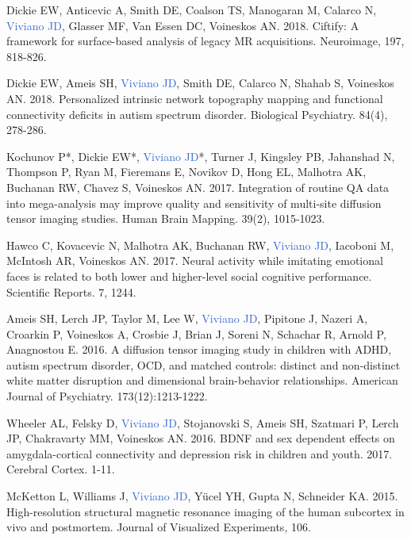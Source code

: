 \documentclass[a4paper,11pt,oneside]{book}
\newcommand\paper[1]{
    #1\\
    \vspace{3.5mm}
}
\begin{document}
\begin{flushleft}
\paper{Dickie EW, Anticevic A, Smith DE, Coalson TS, Manogaran M, Calarco N, \textcolor{highlight}{Viviano JD}, Glasser MF, Van Essen DC, Voineskos AN. 2018. Ciftify: A framework for surface-based analysis of legacy MR acquisitions. Neuroimage, 197, 818-826.}

\paper{Dickie EW, Ameis SH, \textcolor{highlight}{Viviano JD}, Smith DE, Calarco N, Shahab S, Voineskos AN. 2018. Personalized intrinsic network topography mapping and functional connectivity deficits in autism spectrum disorder. Biological Psychiatry. 84(4), 278-286.}


\paper{Kochunov P*, Dickie EW*, \textcolor{highlight}{Viviano JD}*, Turner J, Kingsley PB, Jahanshad N, Thompson P, Ryan M, Fieremans E, Novikov D, Hong EL, Malhotra AK, Buchanan RW, Chavez S, Voineskos AN. 2017. Integration of routine QA data into mega-analysis may improve quality and sensitivity of multi-site diffusion tensor imaging studies. Human Brain Mapping. 39(2), 1015-1023.}

\paper{Hawco C, Kovacevic N, Malhotra AK, Buchanan RW, \textcolor{highlight}{Viviano JD}, Iacoboni M, McIntosh AR, Voineskos AN. 2017. Neural activity while imitating emotional faces is related to both lower and higher-level social cognitive performance. Scientific Reports. 7, 1244.}

\paper{Ameis SH, Lerch JP, Taylor M, Lee W, \textcolor{highlight}{Viviano JD}, Pipitone J, Nazeri A, Croarkin P, Voineskos A, Crosbie J, Brian J, Soreni N, Schachar R, Arnold P, Anagnostou E. 2016. A diffusion tensor imaging study in children with ADHD, autism spectrum disorder, OCD, and matched controls: distinct and non-distinct white matter disruption and dimensional brain-behavior relationships. American Journal of Psychiatry. 173(12):1213-1222.}

\paper{Wheeler AL, Felsky D, \textcolor{highlight}{Viviano JD}, Stojanovski S, Ameis SH, Szatmari P, Lerch JP, Chakravarty MM, Voineskos AN. 2016. BDNF and sex dependent effects on amygdala-cortical connectivity and depression risk in children and youth. 2017. Cerebral Cortex. 1-11.}

\paper{McKetton L, Williams J, \textcolor{highlight}{Viviano JD}, Yücel YH, Gupta N, Schneider KA. 2015. High-resolution structural magnetic resonance imaging of the human subcortex in vivo and postmortem. Journal of Visualized Experiments, 106.}


\end{flushleft}
\end{document}
